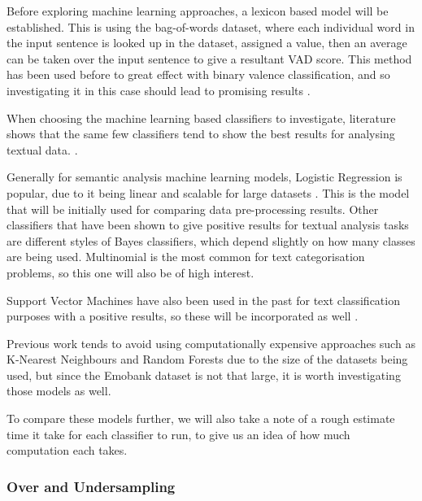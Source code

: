 Before exploring machine learning approaches, a lexicon based model will be established. This is using the bag-of-words dataset, \cite{wordsData} where each individual word in the input sentence is looked up in the dataset, assigned a value, then an average can be taken over the input sentence to give a resultant VAD score. This method has been used before to great effect with binary valence classification, and so investigating it in this case should lead to promising results \cite{kolchyna2015twitter}.

When choosing the machine learning based classifiers to investigate, literature shows that the same few classifiers tend to show the best results for analysing textual data.\cite{kolchyna2015twitter} \cite{frank2006naive}. 

Generally for semantic analysis machine learning models, Logistic Regression is popular, due to it being linear and scalable for large datasets \cite{towardsDS}. This is the model that will be initially used for comparing data pre-processing results.
Other classifiers that have been shown to give positive results for textual analysis tasks are different styles of Bayes classifiers,  which depend slightly on how many classes are being used. Multinomial is the most common for text categorisation problems, so this one will also be of high interest. \cite{frank2006naive}

Support Vector Machines have also been used in the past for text classification purposes with a positive results, so these will be incorporated as well \cite{joachims1998text}.

Previous work tends to avoid using computationally expensive approaches such as K-Nearest Neighbours and Random Forests due to the size of the datasets being used, but since the Emobank dataset is not that large, it is worth investigating those models as well.


To compare these models further, we will also take a note of a rough estimate time it take for each classifier to run, to give us an idea of how much computation each takes.


\subsubsection{Over and Undersampling}

